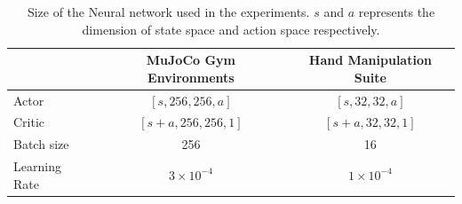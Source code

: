 \begin{table}[H]
\centering
\small
\begin{tabular}{l|c|c}
\hline
& MuJoCo Gym Environments & Hand Manipulation Suite \\
\hline
Actor & $[s,256,256,a]$ & $[s,32,32,a]$ \\ 
\hline
Critic & $[s+a,256,256,1]$ & $[s+a,32,32,1]$ \\ 
\hline
Batch size & 256 & 16 \\ 
\hline
Learning Rate & $3\times 10^{-4}$ & $1\times 10^{-4}$ \\
\hline
\end{tabular}
\vspace{-1ex}
\caption{Size of the Neural network used in the experiments. 
$s$ and $a$ represents the dimension of state space and action space respectively.
}
\label{tab:supp:net:param}
\end{table}

